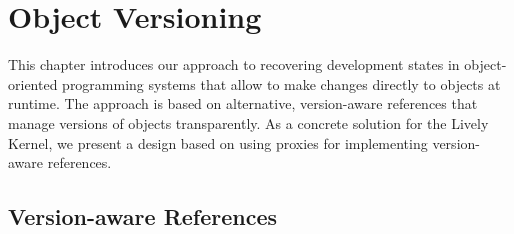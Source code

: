 

\chapter{Object Versioning} \label{chapter:APPROACH}

This chapter introduces our approach to recovering development states in object-oriented programming systems that allow to make changes directly to objects at runtime.
The approach is based on alternative, version-aware references that manage versions of objects transparently.
As a concrete solution for the Lively Kernel, we present a design based on using proxies for implementing version-aware references.


\section{Version-aware References} \label{sec:APPROACH:1}






